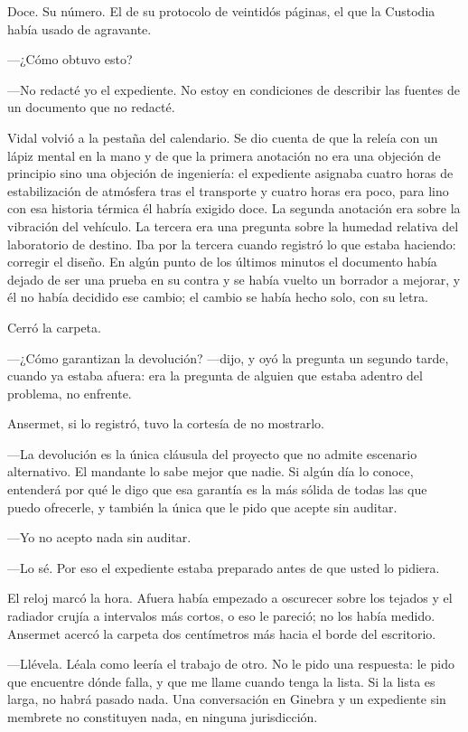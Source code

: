 Doce. Su número. El de su protocolo de veintidós páginas, el que la Custodia había usado de agravante.

---¿Cómo obtuvo esto?

---No redacté yo el expediente. No estoy en condiciones de describir las fuentes de un documento que no redacté.

Vidal volvió a la pestaña del calendario. Se dio cuenta de que la releía con un lápiz mental en la mano y de que la primera anotación no era una objeción de principio sino una objeción de ingeniería: el expediente asignaba cuatro horas de estabilización de atmósfera tras el transporte y cuatro horas era poco, para lino con esa historia térmica él habría exigido doce. La segunda anotación era sobre la vibración del vehículo. La tercera era una pregunta sobre la humedad relativa del laboratorio de destino. Iba por la tercera cuando registró lo que estaba haciendo: corregir el diseño. En algún punto de los últimos minutos el documento había dejado de ser una prueba en su contra y se había vuelto un borrador a mejorar, y él no había decidido ese cambio; el cambio se había hecho solo, con su letra.

Cerró la carpeta.

---¿Cómo garantizan la devolución? ---dijo, y oyó la pregunta un segundo tarde, cuando ya estaba afuera: era la pregunta de alguien que estaba adentro del problema, no enfrente.

Ansermet, si lo registró, tuvo la cortesía de no mostrarlo.

---La devolución es la única cláusula del proyecto que no admite escenario alternativo. El mandante lo sabe mejor que nadie. Si algún día lo conoce, entenderá por qué le digo que esa garantía es la más sólida de todas las que puedo ofrecerle, y también la única que le pido que acepte sin auditar.

---Yo no acepto nada sin auditar.

---Lo sé. Por eso el expediente estaba preparado antes de que usted lo pidiera.

El reloj marcó la hora. Afuera había empezado a oscurecer sobre los tejados y el radiador crujía a intervalos más cortos, o eso le pareció; no los había medido. Ansermet acercó la carpeta dos centímetros más hacia el borde del escritorio.

---Llévela. Léala como leería el trabajo de otro. No le pido una respuesta: le pido que encuentre dónde falla, y que me llame cuando tenga la lista. Si la lista es larga, no habrá pasado nada. Una conversación en Ginebra y un expediente sin membrete no constituyen nada, en ninguna jurisdicción.

